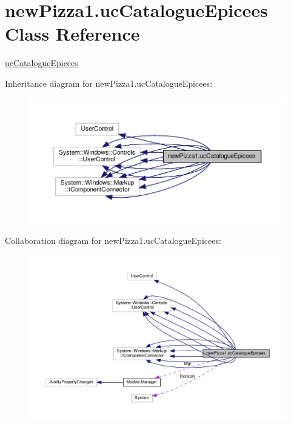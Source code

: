 \hypertarget{classnewPizza1_1_1ucCatalogueEpicees}{}\section{new\+Pizza1.\+uc\+Catalogue\+Epicees Class Reference}
\label{classnewPizza1_1_1ucCatalogueEpicees}


\hyperlink{classnewPizza1_1_1ucCatalogueEpicees}{uc\+Catalogue\+Epicees}  




Inheritance diagram for new\+Pizza1.\+uc\+Catalogue\+Epicees\+:
\nopagebreak
\begin{figure}[H]
\begin{center}
\leavevmode
\includegraphics[width=350pt]{classnewPizza1_1_1ucCatalogueEpicees__inherit__graph}
\end{center}
\end{figure}


Collaboration diagram for new\+Pizza1.\+uc\+Catalogue\+Epicees\+:
\nopagebreak
\begin{figure}[H]
\begin{center}
\leavevmode
\includegraphics[width=350pt]{classnewPizza1_1_1ucCatalogueEpicees__coll__graph}
\end{center}
\end{figure}
